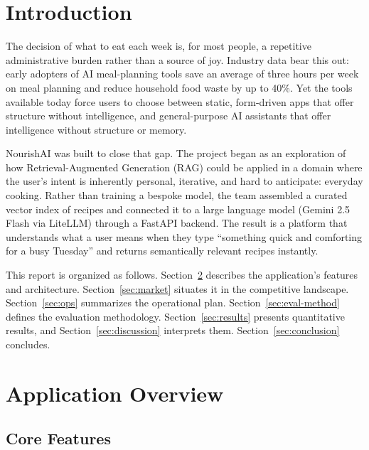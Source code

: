\documentclass[12pt,letterpaper]{article}
\begin{document}
\newpage
\tableofcontents
\newpage

\section{Introduction}

The decision of what to eat each week is, for most people, a repetitive administrative burden
rather than a source of joy. Industry data bear this out: early adopters of AI meal-planning
tools save an average of three hours per week on meal planning and reduce household food
waste by up to 40\%. Yet the tools available today force users to choose between static,
form-driven apps that offer structure without intelligence, and general-purpose AI assistants
that offer intelligence without structure or memory.

NourishAI was built to close that gap. The project began as an exploration of how
Retrieval-Augmented Generation (RAG) could be applied in a domain where the user's intent
is inherently personal, iterative, and hard to anticipate: everyday cooking. Rather than
training a bespoke model, the team assembled a curated vector index of recipes and connected
it to a large language model (Gemini 2.5 Flash via LiteLLM) through a FastAPI backend.
The result is a platform that understands what a user means when they type ``something
quick and comforting for a busy Tuesday'' and returns semantically relevant recipes
instantly.

This report is organized as follows. Section~\ref{sec:app} describes the application's
features and architecture. Section~\ref{sec:market} situates it in the competitive landscape.
Section~\ref{sec:ops} summarizes the operational plan. Section~\ref{sec:eval-method}
defines the evaluation methodology. Section~\ref{sec:results} presents quantitative results,
and Section~\ref{sec:discussion} interprets them. Section~\ref{sec:conclusion} concludes.

\section{Application Overview}
\label{sec:app}

\subsection{Core Features}
\end{document}
